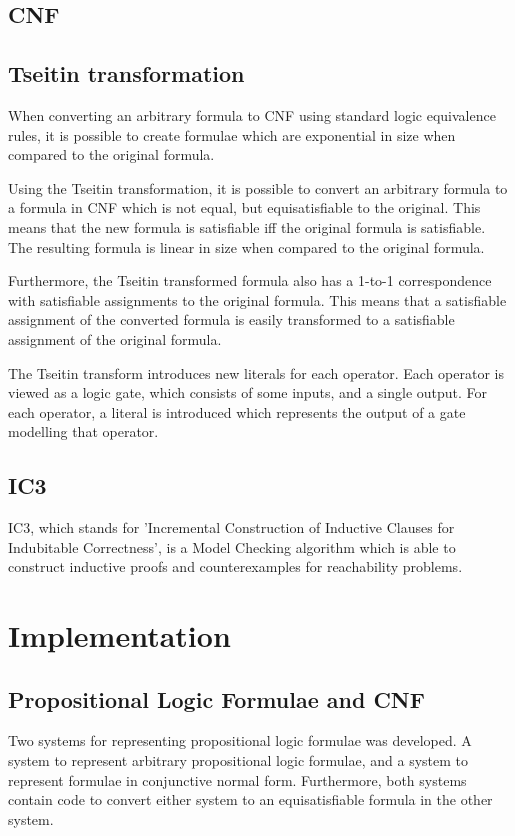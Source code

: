 \documentclass[a4paper]{article}
\begin{document}
\subsection{CNF}
\subsection{Tseitin transformation}
When converting an arbitrary formula to CNF using standard logic equivalence rules, it is possible to create formulae which are exponential in size when compared to the original formula.

Using the Tseitin transformation, it is possible to convert an arbitrary formula to a formula in CNF which is not equal, but equisatisfiable to the original. This means that the new formula is satisfiable iff the original formula is satisfiable. The resulting formula is linear in size when compared to the original formula.

Furthermore, the Tseitin transformed formula also has a 1-to-1 correspondence with satisfiable assignments to the original formula. This means that a satisfiable assignment of the converted formula is easily transformed to a satisfiable assignment of the original formula.

The Tseitin transform introduces new literals for each operator. Each operator is viewed as a logic gate, which consists of some inputs, and a single output. For each operator, a literal is introduced which represents the output of a gate modelling that operator.


\subsection{IC3}
IC3, which stands for 'Incremental Construction of Inductive Clauses for Indubitable Correctness', is a Model Checking algorithm which is able to construct inductive proofs and counterexamples for reachability problems.


\section{Implementation}
\subsection{Propositional Logic Formulae and CNF}
Two systems for representing propositional logic formulae was developed. A system to represent arbitrary propositional logic formulae, and a system to represent formulae in conjunctive normal form. Furthermore, both systems contain code to convert either system to an equisatisfiable formula in the other system.
\end{document}
